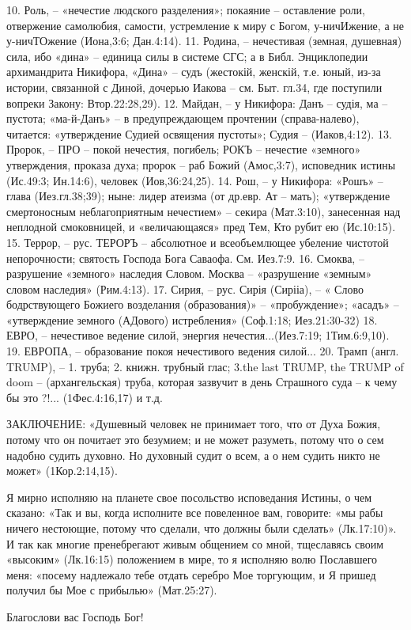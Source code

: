 10. Роль, – «нечестие людского разделения»; покаяние – оставление роли, отвержение самолюбия, самости, устремление к миру с Богом,  у-ничИжение, а не  у-ничТОжение (Иона,3:6;  Дан.4:14).
11. Родина, – нечестивая (земная, душевная) сила, ибо «дина» – единица силы в системе СГС; а в Библ. Энциклопедии архимандрита Никифора,  «Дина» – судъ (жестокій, женскій, т.е. юный, из-за истории, связанной с Диной, дочерью Иакова – см. Быт. гл.34, где поступили вопреки Закону: Втор.22:28,29).
12. Майдан, – у Никифора: Данъ – судія, ма – пустота;  «ма-й-Данъ» – в предупреждающем прочтении (справа-налево), читается: «утверждение Судией освящения пустоты»; Судия – (Иаков,4:12).
13. Пророк, – ПРО – покой нечестия, погибель;  РОКЪ – нечестие «земного» утверждения, проказа духа;
      пророк – раб Божий (Амос,3:7), исповедник истины (Ис.49:3; Ин.14:6), человек (Иов,36:24,25).
14. Рош, – у Никифора: «Рошъ» – глава (Иез.гл.38;39); ныне: лидер атеизма (от др.евр. Ат – мать);
      «утверждение смертоносным неблагоприятным нечестием» – секира (Мат.3:10), занесенная над неплодной смоковницей, и «величающаяся» пред Тем, Кто рубит ею (Ис.10:15).
15. Террор, – рус. ТЕРОРЪ – абсолютное и всеобъемлющее убеление чистотой непорочности;  святость Господа Бога Саваофа. См. Иез.7:9.
16. Смоква, – разрушение «земного» наследия Словом.   Москва – «разрушение «земным» словом наследия» (Рим.4:13).
17. Сирия, – рус. Сирія (Сирііа), – « Слово бодрствующего Божиего возделания (образования)» – «пробуждение»;  «асадъ» – «утверждение земного (АДового) истребления» (Соф.1:18;  Иез.21:30-32)
18. ЕВРО, – нечестивое ведение силой, энергия нечестия...(Иез.7:19;  1Тим.6:9,10).
19. ЕВРОПА, – образование покоя нечестивого ведения силой...   
20. Трамп (англ. TRUMP), – 1. труба;  2. книжн. трубный глас; 3.the last TRUMP, the TRUMP of doom –  (архангельская) труба, которая зазвучит в день Страшного суда – к чему бы это ?!... (1Фес.4:16,17)
          и т.д.

                ЗАКЛЮЧЕНИЕ:
«Душевный человек не принимает того, что от Духа Божия, потому что он почитает это безумием; и не может разуметь, потому что о сем надобно судить духовно.  Но духовный судит о всем, а о нем судить никто не может» (1Кор.2:14,15).

     Я мирно исполняю на планете свое посольство исповедания Истины, о чем сказано: «Так и вы, когда исполните все повеленное вам, говорите: «мы рабы ничего нестоющие, потому что сделали, что должны были сделать» (Лк.17:10)».  И так как многие пренебрегают живым общением со мной, тщеславясь своим «высоким» (Лк.16:15) положением в мире, то я исполняю волю Пославшего меня: «посему надлежало тебе отдать серебро Мое торгующим, и Я пришед получил бы Мое с прибылью» (Мат.25:27).

    
      Благослови вас Господь Бог! 
